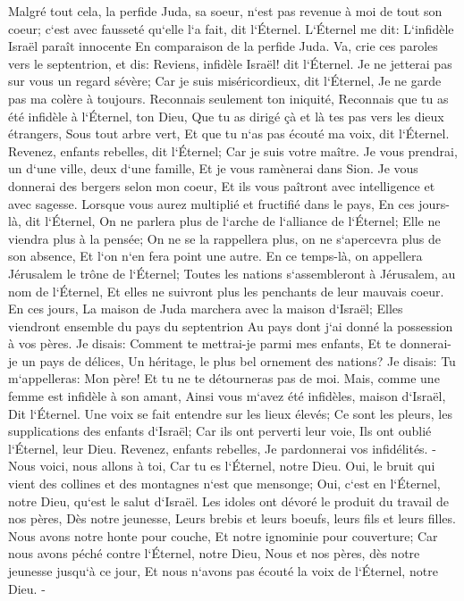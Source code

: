 \verse Malgré tout cela, la perfide Juda, sa soeur, n`est pas revenue à moi de tout son coeur; c`est avec fausseté qu`elle l`a fait, dit l`Éternel. 
\verse L`Éternel me dit: L`infidèle Israël paraît innocente En comparaison de la perfide Juda. 
\verse Va, crie ces paroles vers le septentrion, et dis: Reviens, infidèle Israël! dit l`Éternel. Je ne jetterai pas sur vous un regard sévère; Car je suis miséricordieux, dit l`Éternel, Je ne garde pas ma colère à toujours. 
\verse Reconnais seulement ton iniquité, Reconnais que tu as été infidèle à l`Éternel, ton Dieu, Que tu as dirigé çà et là tes pas vers les dieux étrangers, Sous tout arbre vert, Et que tu n`as pas écouté ma voix, dit l`Éternel. 
\verse Revenez, enfants rebelles, dit l`Éternel; Car je suis votre maître. Je vous prendrai, un d`une ville, deux d`une famille, Et je vous ramènerai dans Sion. 
\verse Je vous donnerai des bergers selon mon coeur, Et ils vous paîtront avec intelligence et avec sagesse. 
\verse Lorsque vous aurez multiplié et fructifié dans le pays, En ces jours-là, dit l`Éternel, On ne parlera plus de l`arche de l`alliance de l`Éternel; Elle ne viendra plus à la pensée; On ne se la rappellera plus, on ne s`apercevra plus de son absence, Et l`on n`en fera point une autre. 
\verse En ce temps-là, on appellera Jérusalem le trône de l`Éternel; Toutes les nations s`assembleront à Jérusalem, au nom de l`Éternel, Et elles ne suivront plus les penchants de leur mauvais coeur. 
\verse En ces jours, La maison de Juda marchera avec la maison d`Israël; Elles viendront ensemble du pays du septentrion Au pays dont j`ai donné la possession à vos pères. 
\verse Je disais: Comment te mettrai-je parmi mes enfants, Et te donnerai-je un pays de délices, Un héritage, le plus bel ornement des nations? Je disais: Tu m`appelleras: Mon père! Et tu ne te détourneras pas de moi. 
\verse Mais, comme une femme est infidèle à son amant, Ainsi vous m`avez été infidèles, maison d`Israël, Dit l`Éternel. 
\verse Une voix se fait entendre sur les lieux élevés; Ce sont les pleurs, les supplications des enfants d`Israël; Car ils ont perverti leur voie, Ils ont oublié l`Éternel, leur Dieu. 
\verse Revenez, enfants rebelles, Je pardonnerai vos infidélités. -Nous voici, nous allons à toi, Car tu es l`Éternel, notre Dieu. 
\verse Oui, le bruit qui vient des collines et des montagnes n`est que mensonge; Oui, c`est en l`Éternel, notre Dieu, qu`est le salut d`Israël. 
\verse Les idoles ont dévoré le produit du travail de nos pères, Dès notre jeunesse, Leurs brebis et leurs boeufs, leurs fils et leurs filles. 
\verse Nous avons notre honte pour couche, Et notre ignominie pour couverture; Car nous avons péché contre l`Éternel, notre Dieu, Nous et nos pères, dès notre jeunesse jusqu`à ce jour, Et nous n`avons pas écouté la voix de l`Éternel, notre Dieu. - 

